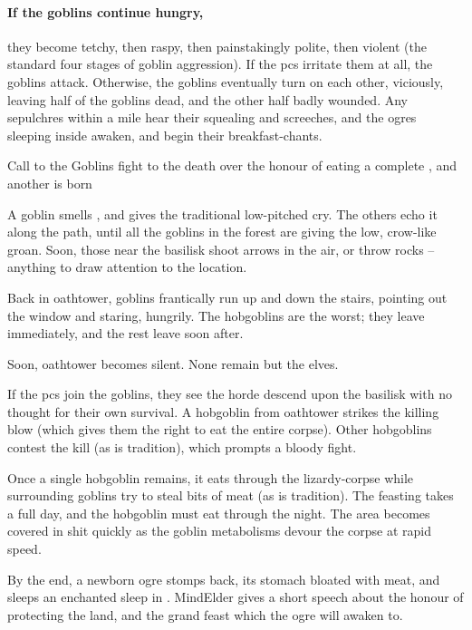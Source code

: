 \paragraph{If the goblins continue hungry,}
they become tetchy, then raspy, then painstakingly polite, then violent (the standard four stages of goblin aggression).
If the \glspl{pc} irritate them at all, the goblins attack.
Otherwise, the goblins eventually turn on each other, viciously, leaving half of the goblins dead, and the other half badly wounded.
Any \glspl{sepulchre} within a mile hear their squealing and screeches, and the \glspl{ogre} sleeping inside awaken, and begin their breakfast-chants.

{Call to the }%
{Goblins fight to the death over the honour of eating a complete , and another  is born}%

A goblin smells , and gives the traditional low-pitched cry.
The others echo it along the path, until all the goblins in the forest are giving the low, crow-like groan.
Soon, those near the \gls{basilisk} shoot arrows in the air, or throw rocks -- anything to draw attention to the location.

Back in \gls{oathtower}, goblins frantically run up and down the stairs, pointing out the window and staring, hungrily.
The hobgoblins are the worst; they leave immediately, and the rest leave soon after.

Soon, \gls{oathtower} becomes silent.
None remain but the elves.

If the \glspl{pc} join the goblins, they see the horde descend upon the \gls{basilisk} with no thought for their own survival.
A hobgoblin from \gls{oathtower} strikes the killing blow (which gives them the right to eat the entire corpse).
Other hobgoblins contest the kill (as is tradition), which prompts a bloody fight.

Once a single hobgoblin remains, it eats through the lizardy-corpse while surrounding goblins try to steal bits of meat (as is tradition).
The feasting takes a full day, and the hobgoblin must eat through the night.
The area becomes covered in shit quickly as the goblin metabolisms devour the corpse at rapid speed.

By the end, a newborn \gls{ogre} stomps back, its stomach bloated with meat, and sleeps an enchanted sleep in .
\Gls{MindElder} gives a short speech about the honour of protecting the land, and the grand feast which the \gls{ogre} will awaken to.
